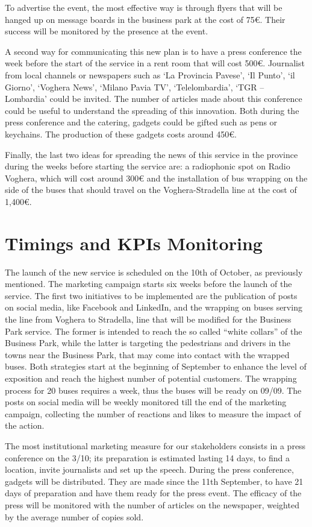 To advertise the event, the most effective way is through flyers that will be hanged up on message boards in the business park at the cost of 75€. Their success will be monitored by the presence at the event. 

A second way for communicating this new plan is to have a press conference the week before the start of the service in a rent room that will cost 500€. Journalist from local channels or newspapers such as ‘La Provincia Pavese’, ‘Il Punto’, ‘il Giorno’, ‘Voghera News’, ‘Milano Pavia TV’, ‘Telelombardia’, ‘TGR – Lombardia’ could be invited. The number of articles made about this conference could be useful to understand the spreading of this innovation. Both during the press conference and the catering, gadgets could be gifted such as pens or keychains. The production of these gadgets costs around 450€.

Finally, the last two ideas for spreading the news of this service in the province during the weeks before starting the service are: a radiophonic spot on Radio Voghera, which will cost around 300€ and the installation of bus wrapping on the side of the buses that should travel on the Voghera-Stradella line at the cost of 1,400€.


\section{Timings and KPIs Monitoring}

The launch of the new service is scheduled on the 10th of October, as previously mentioned. The marketing campaign starts six weeks before the launch of the service. The first two initiatives to be implemented are the publication of posts on social media, like Facebook and LinkedIn, and the wrapping on buses serving the line from Voghera to Stradella, line that will be modified for the Business Park service. The former is intended to reach the so called “white collars” of the Business Park, while the latter is targeting the pedestrians and drivers in the towns near the Business Park, that may come into contact with the wrapped buses. Both strategies start at the beginning of September to enhance the level of exposition and reach the highest number of potential customers. The wrapping process for 20 buses requires a week, thus the buses will be ready on 09/09. The posts on social media will be weekly monitored till the end of the marketing campaign, collecting the number of reactions and likes to measure the impact of the action.

The most institutional marketing measure for our stakeholders consists in a press conference on the 3/10; its preparation is estimated lasting 14 days, to find a location, invite journalists and set up the speech. During the press conference, gadgets will be distributed. They are made since the 11th September, to have 21 days of preparation and have them ready for the press event. The efficacy of the press will be monitored with the number of articles on the newspaper, weighted by the average number of copies sold.

